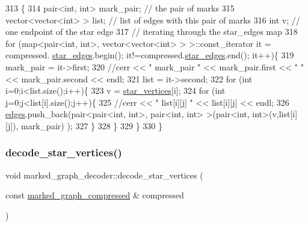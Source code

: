 \begin{DoxyCode}
313 \{
314   pair<int, int> mark\_pair; \textcolor{comment}{// the pair of marks}
315   vector<vector<int> > list; \textcolor{comment}{// list of edges with this pair of marks}
316   \textcolor{keywordtype}{int} v; \textcolor{comment}{// one endpoint of the star edge}
317   \textcolor{comment}{// iterating through the star\_edges map}
318   \textcolor{keywordflow}{for} (map<pair<int, int>, vector<vector<int> > >::const\_iterator it = compressed.
      \hyperlink{classmarked__graph__compressed_a7df5779d313486644132bd816937f532}{star\_edges}.begin(); it!=compressed.\hyperlink{classmarked__graph__compressed_a7df5779d313486644132bd816937f532}{star\_edges}.end(); it++)\{
319     mark\_pair = it->first;
320     \textcolor{comment}{//cerr << " mark\_pair " << mark\_pair.first << " " << mark\_pair.second << endl;}
321     list = it->second;
322     \textcolor{keywordflow}{for} (\textcolor{keywordtype}{int} i=0;i<list.size();i++)\{
323       v = \hyperlink{classmarked__graph__decoder_a06fc05827db14b675f7ecc2fd915b533}{star\_vertices}[i];
324       \textcolor{keywordflow}{for} (\textcolor{keywordtype}{int} j=0;j<list[i].size();j++)\{
325         \textcolor{comment}{//cerr << " list[i][j] " << list[i][j] << endl;}
326         \hyperlink{classmarked__graph__decoder_af9e75da0a495d9c3bdcd169e15e3261e}{edges}.push\_back(pair<pair<int, int>, pair<int, int> >(pair<int, int>(v,list[i][j]), mark\_pair)
      );
327       \}
328     \}
329   \}
330 \}
\end{DoxyCode}
\mbox{\label{classmarked__graph__decoder_a57fba34d119743414a38c7339b910d99}} 
\subsubsection{\texorpdfstring{decode\+\_\+star\+\_\+vertices()}{decode\_star\_vertices()}}
{\footnotesize\ttfamily void marked\+\_\+graph\+\_\+decoder\+::decode\+\_\+star\+\_\+vertices (\begin{DoxyParamCaption}\item[{const \hyperlink{classmarked__graph__compressed}{marked\+\_\+graph\+\_\+compressed} \&}]{compressed }\end{DoxyParamCaption})\hspace{0.3cm}{\ttfamily [private]}}


